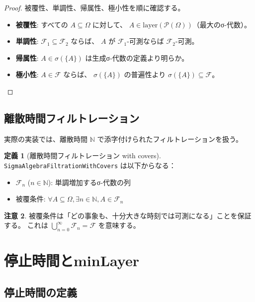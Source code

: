 \documentclass[a4paper,12pt]{ltjsarticle}
\theoremstyle{definition}
\newtheorem{definition}{定義}[section]
\newtheorem{remark}[definition]{注意}
\begin{document}
\begin{proof}
被覆性、単調性、帰属性、極小性を順に確認する。
\begin{itemize}
  \item \textbf{被覆性}: すべての $A \subseteq \Omega$ に対して、
        $A \in \mathrm{layer}(\mathcal{P}(\Omega))$（最大のσ-代数）。
  \item \textbf{単調性}: $\mathcal{F}_1 \subseteq \mathcal{F}_2$ ならば、
        $A$ が $\mathcal{F}_1$-可測ならば $\mathcal{F}_2$-可測。
  \item \textbf{帰属性}: $A \in \sigma(\{A\})$ は生成σ-代数の定義より明らか。
  \item \textbf{極小性}: $A \in \mathcal{F}$ ならば、
        $\sigma(\{A\})$ の普遍性より $\sigma(\{A\}) \subseteq \mathcal{F}$。
\end{itemize}
\end{proof}

\subsection{離散時間フィルトレーション}

実際の実装では、離散時間 $\mathbb{N}$ で添字付けられたフィルトレーションを扱う。

\begin{definition}[離散時間フィルトレーション with covers]
\texttt{SigmaAlgebraFiltrationWithCovers} は以下からなる：
\begin{itemize}
  \item $\mathcal{F}_n$ ($n \in \mathbb{N}$): 単調増加するσ-代数の列
  \item 被覆条件: $\forall A \subseteq \Omega, \exists n \in \mathbb{N},
        A \in \mathcal{F}_n$
\end{itemize}
\end{definition}

\begin{remark}
被覆条件は「どの事象も、十分大きな時刻では可測になる」ことを保証する。
これは $\bigcup_{n=0}^\infty \mathcal{F}_n = \mathcal{F}$ を意味する。
\end{remark}

\section{停止時間とminLayer}

\subsection{停止時間の定義}
\end{document}
